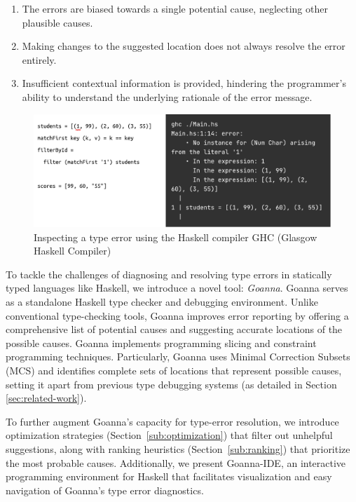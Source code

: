 \documentclass[pdflatex,lineno,sn-nature,Numbered]{sn-jnl}%
\begin{document}
\begin{enumerate}
    \item The errors are biased towards a single potential cause, neglecting other plausible causes.
    \item Making changes to the suggested location does not always resolve the error entirely.
    \item Insufficient contextual information is provided, hindering the programmer's ability to understand the underlying rationale of the error message.
\end{enumerate}


\begin{figure}[ht!]
    \centering
    \includegraphics[width=\linewidth]{images/motivation}
    \caption{Inspecting a type error using the Haskell compiler GHC (Glasgow Haskell Compiler)}
    \label{fig:motivation}
\end{figure}

To tackle the challenges of diagnosing and resolving type errors in statically typed languages like Haskell, we introduce a novel tool: \textit{Goanna}. Goanna serves as a standalone Haskell type checker and debugging environment. Unlike conventional type-checking tools, Goanna improves error reporting by offering a comprehensive list of potential causes and suggesting accurate locations of the possible causes. Goanna implements programming slicing and constraint programming techniques. Particularly, Goanna uses  Minimal Correction Subsets (MCS) and identifies complete sets of locations that represent possible causes, setting it apart from previous type debugging systems (as detailed in Section \ref{sec:related-work}).

To further augment Goanna's capacity for type-error resolution, we introduce optimization strategies (Section~\ref{sub:optimization}) that filter out unhelpful suggestions, along with ranking heuristics (Section~\ref{sub:ranking}) that prioritize the most probable causes. Additionally, we present Goanna-IDE, an interactive programming environment for Haskell that facilitates visualization and easy navigation of Goanna's type error diagnostics.
\end{document}
